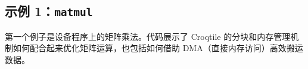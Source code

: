 \subsection*{示例 1：\texttt{matmul}}

第一个例子是设备程序上的矩阵乘法。代码展示了 Croqtile 的分块和内存管理机制如何配合起来优化矩阵运算，也包括如何借助 DMA（直接内存访问）高效搬运数据。
